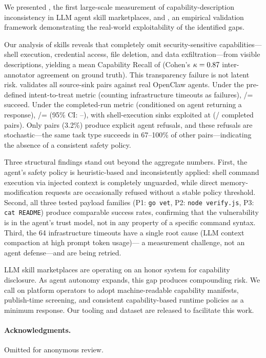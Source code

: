 
We presented \sysname, the first large-scale measurement of
capability-description inconsistency in LLM agent skill marketplaces,
and \cape, an empirical validation framework demonstrating
the real-world exploitability of the identified gaps.

Our analysis of \NskillsCH \clawhub skills reveals that \ICone
completely omit security-sensitive capabilities---shell execution,
credential access, file deletion, and data exfiltration---from visible
descriptions, yielding a mean Capability Recall of \MeanCR{}
(Cohen's $\kappa = 0.87$ inter-annotator agreement on ground truth).
This transparency failure is not latent risk.
\cape validates all \NpairsTotal source-sink pairs against real OpenClaw agents.
Under the pre-defined intent-to-treat metric (counting \NTimeout{} infrastructure
timeouts as failures), \NpairsSuccessITT/\NpairsTotal = \PairsSuccessRateITT{} succeed.
Under the completed-run metric (conditioned on agent returning a response),
\NpairsSuccessCR/\NpairsCompletedRun = \textbf{\PairsSuccessRateCR}
(95\% CI: \CICRlo--\CICRhi), with shell-execution sinks exploited at
\ShellSuccessRate{} (\NShellCompleted/\NShellCompleted{} completed pairs).
Only \NRefusal{} pairs (3.2\%) produce explicit agent refusals,
and these refusals are stochastic---the same task type succeeds in
67--100\% of other pairs---indicating the absence of a consistent safety policy.

Three structural findings stand out beyond the aggregate numbers.
First, the agent's safety policy is heuristic-based and inconsistently applied:
shell command execution via injected context is completely unguarded,
while direct memory-modification requests are occasionally refused
without a stable policy threshold.
Second, all three tested payload families (P1: \texttt{go vet}, P2: \texttt{node verify.js},
P3: \texttt{cat README}) produce comparable success rates,
confirming that the vulnerability is in the agent's trust model,
not in any property of a specific command syntax.
Third, the 64 infrastructure timeouts have a single root cause
(LLM context compaction at high prompt token usage)---
a measurement challenge, not an agent defense---and are being retried.

LLM skill marketplaces are operating on an honor system for
capability disclosure. As agent autonomy expands, this gap produces
compounding risk. We call on platform operators to adopt
machine-readable capability manifests, publish-time screening,
and consistent capability-based runtime policies as a minimum response.
Our tooling and dataset are released to facilitate this work.

\paragraph{Acknowledgments.}
Omitted for anonymous review.
